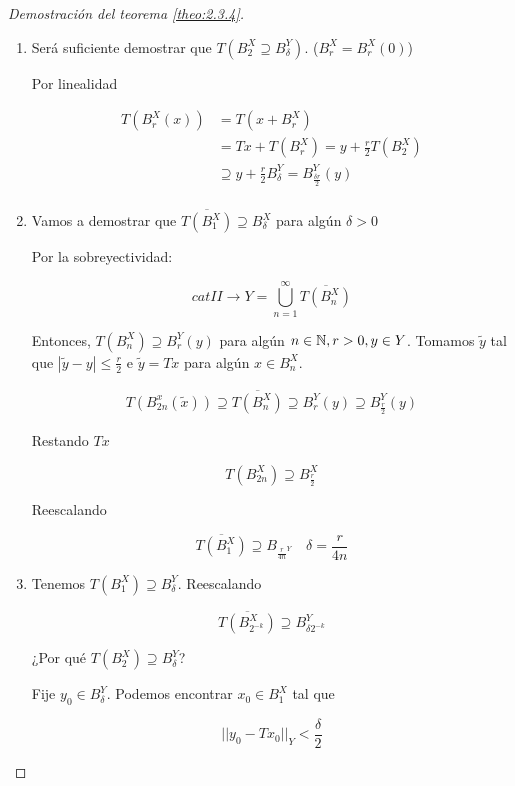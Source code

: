 \begin{proof}[Demostración del teorema \ref{theo:2.3.4}]
    \begin{enumerate}
        \item Será suficiente demostrar que $T(B_2^X\supseteq B_\delta^Y)$. ($B_r^X=B_r^X(0)$)
        
        Por linealidad

        \begin{align*}
            T(B_r^X(x))&=T(x+B_r^X)\\
            &=Tx+T(B_r^X)={y+\frac{r}{2}T(B_2^X)}\\
            &\supseteq y+\frac{r}{2}B_\delta^Y=B_{\frac{\delta r}{2}}^Y(y)\\
        \end{align*}

        \item Vamos a demostrar que $\overline{T(B_1^X)}\supseteq B_\delta^X$ para algún $\delta>0$
        
        Por la sobreyectividad:

        \[cat II\rightarrow Y=\bigcup_{n=1}^\infty \overline{T(B_n^X)}\]

        Entonces, $T(B_n^X)\supseteq B_r^Y(y)$ para algún $n\in\mathbb{N},r>0,y\in Y$. Tomamos $\tilde y$ tal que $|\tilde y-y|\leq \frac{r}{2}$ e $\tilde y=Tx$ para algún $x\in B_n^X$.

        \begin{align*}
            T(B_{2n}^x(\tilde x))\supseteq \overline{T(B_n^X)}\supseteq B_r^Y(y)\supseteq B_{\frac{r}{2}}^Y(y)
        \end{align*}

        Restando $Tx$

        \[T(B_{2n}^X)\supseteq B_{\frac{r}{2}}^X\]

        Reescalando

        \[\overline{T(B_1^X)}\supseteq B_{\frac{r}{4n}^Y}\quad \delta=\frac{r}{4n}\]

        \item Tenemos $T(B_1^X)\supseteq B_\delta^Y$. Reescalando
        
        \[\overline{T(B_{2^{-k}}^X)}\supseteq B_{\delta 2^{-k}}^Y\]

        ¿Por qué $T(B_2^X)\supseteq B_\delta^Y$?

        Fije $y_0\in B_\delta^Y$. Podemos encontrar $x_0\in B_1^X$ tal que 

        \[||y_0-Tx_0||_Y<\frac{\delta}{2}\]


\end{enumerate}
\end{proof}
